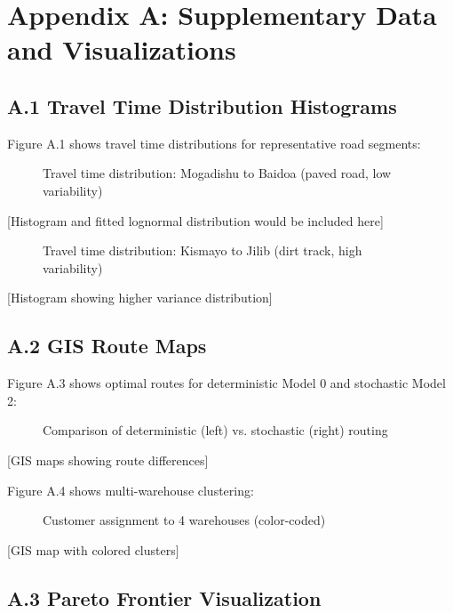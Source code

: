 \section{Appendix A: Supplementary Data and Visualizations}

\subsection{A.1 Travel Time Distribution Histograms}

Figure A.1 shows travel time distributions for representative road segments:

\begin{figure}[H]
\centering
\caption{Travel time distribution: Mogadishu to Baidoa (paved road, low variability)}
\end{figure}

[Histogram and fitted lognormal distribution would be included here]

\begin{figure}[H]
\centering
\caption{Travel time distribution: Kismayo to Jilib (dirt track, high variability)}
\end{figure}

[Histogram showing higher variance distribution]

\subsection{A.2 GIS Route Maps}

Figure A.3 shows optimal routes for deterministic Model 0 and stochastic Model 2:

\begin{figure}[H]
\centering
\caption{Comparison of deterministic (left) vs. stochastic (right) routing}
\end{figure}

[GIS maps showing route differences]

Figure A.4 shows multi-warehouse clustering:

\begin{figure}[H]
\centering
\caption{Customer assignment to 4 warehouses (color-coded)}
\end{figure}

[GIS map with colored clusters]

\subsection{A.3 Pareto Frontier Visualization}

